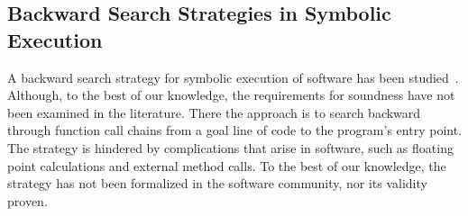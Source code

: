 \subsection{Backward Search Strategies in Symbolic Execution}

A backward search strategy for symbolic execution of software has been
studied~\cite{ma2011directed,chandra09,dinges04,charreteur10}. Although, to
  the best of our knowledge, the
  requirements for soundness have not been examined in the literature. 
  There the approach is to search
backward through function call chains from a goal line of code to the program's
entry point. The strategy is hindered by complications that arise in software,
such as floating point calculations and external method calls. To the best of our knowledge, the strategy has not been formalized
in the software community, nor its validity proven.

